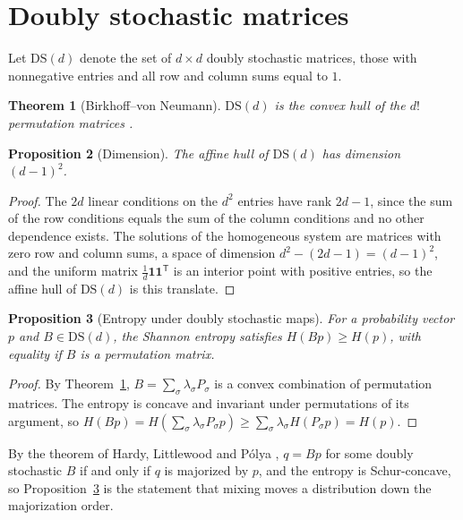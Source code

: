 \documentclass[11pt,oneside]{book}
\newtheorem{theorem}{Theorem}[chapter]
\newtheorem{proposition}[theorem]{Proposition}
\theoremstyle{definition}
\theoremstyle{remark}
\begin{document}
\section*{Doubly stochastic matrices}

Let $\mathrm{DS}(d)$ denote the set of $d\times d$ doubly stochastic matrices, those with nonnegative entries and all row and column sums equal to $1$.

\begin{theorem}[Birkhoff--von Neumann]\label{thm:app-bvn}
$\mathrm{DS}(d)$ is the convex hull of the $d!$ permutation matrices \cite{birkhoff1946}.
\end{theorem}

\begin{proposition}[Dimension]\label{prop:app-dim}
The affine hull of $\mathrm{DS}(d)$ has dimension $(d-1)^2$.
\end{proposition}

\begin{proof}
The $2d$ linear conditions on the $d^2$ entries have rank $2d-1$, since the sum of the row conditions equals the sum of the column conditions and no other dependence exists. The solutions of the homogeneous system are matrices with zero row and column sums, a space of dimension $d^2-(2d-1)=(d-1)^2$, and the uniform matrix $\tfrac1d\mathbf 1\mathbf 1^{\mathsf T}$ is an interior point with positive entries, so the affine hull of $\mathrm{DS}(d)$ is this translate.
\end{proof}

\begin{proposition}[Entropy under doubly stochastic maps]\label{prop:app-entropy}
For a probability vector $p$ and $B\in\mathrm{DS}(d)$, the Shannon entropy satisfies $H(Bp)\geq H(p)$, with equality if $B$ is a permutation matrix.
\end{proposition}

\begin{proof}
By Theorem~\ref{thm:app-bvn}, $B=\sum_\sigma\lambda_\sigma P_\sigma$ is a convex combination of permutation matrices. The entropy is concave and invariant under permutations of its argument, so $H(Bp)=H(\sum_\sigma\lambda_\sigma P_\sigma p)\geq\sum_\sigma\lambda_\sigma H(P_\sigma p)=H(p)$.
\end{proof}

By the theorem of Hardy, Littlewood and P\'olya \cite{hlp1952}, $q=Bp$ for some doubly stochastic $B$ if and only if $q$ is majorized by $p$, and the entropy is Schur-concave, so Proposition~\ref{prop:app-entropy} is the statement that mixing moves a distribution down the majorization order.
\end{document}
